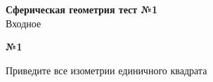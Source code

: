 


    \begin{center}
        \textbf{Сферическая геометрия тест №1}\\
        Входное
    \end{center}

    \begin{center}
        \textbf{№1}
    \end{center}

    Приведите все изометрии единичного квадрата


